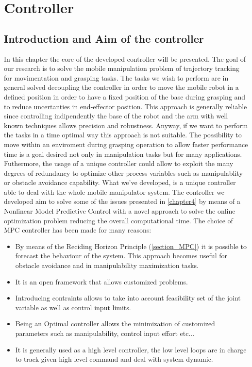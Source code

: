 
\chapter{Controller}
\label{chapter5}

\section{Introduction and Aim of the controller}

In this chapter the core of the developed controller will be presented. The goal of our research is to solve the mobile manipulation problem of trajectory tracking for movimentation and grasping tasks. The tasks we wish to perform are in general solved decoupling the controller in order to move the mobile robot in a defined position in order to have a fixed position of the base during grasping and to reduce uncertanties in end-effector position. This approach is generally reliable since controlling indipendently the base of the robot and the arm with well known techniques allows precision and robustness. Anyway, if we want to perform the tasks in a time optimal way this approach is not suitable. The possibility to move within an enviroment during grasping operation to allow faster performance time is a goal desired not only in manipulation tasks but for many applications. Futhermore, the usage of a unique controller could allow to exploit the many degrees of redundancy to optimize other process variables such as manipulablity or obstacle avoidance capability. What we've developed, is a unique controller able to deal with the whole mobile manipulator system. The controller we developed aim to solve some of the issues presented in \ref{chapter4} by means of a Nonlinear Model Predictive Control with a novel approach to solve the online optimization problem reducing the overall computational time. The choice of MPC controller has been made for many reasons: 

\begin{itemize}
\item By means of the Reciding Horizon Principle (\ref{section_MPC}) it is possible to forecast the behaviour of the system. This approach becomes useful for obstacle avoidance and in manipulability maximization tasks.
\item It is an open framework that allows customized problems.
\item Introducing contraints allows to take into account feasibility set of the joint variable as well as control input limits.
\item Being an Optimal controller allows the minimization of customized parameters such as manipulability, control input effort etc...
\item It is generally used as a high level controller, the low level loops are in charge to track given high level command and deal with system dynamic.
\end{itemize}

